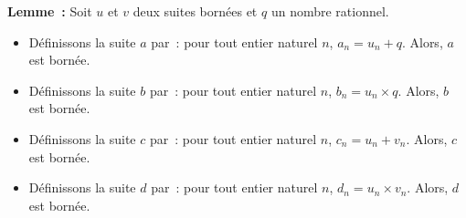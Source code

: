     \done

\medskip

\noindent\textbf{Lemme :} Soit $u$ et $v$ deux suites bornées et $q$ un nombre rationnel.
    \begin{itemize}[nosep]
        \item Définissons la suite $a$ par : pour tout entier naturel $n$, $a_n = u_n + q$.
            Alors, $a$ est bornée.
        \item Définissons la suite $b$ par : pour tout entier naturel $n$, $b_n = u_n \times q$.
            Alors, $b$ est bornée.
        \item Définissons la suite $c$ par : pour tout entier naturel $n$, $c_n = u_n + v_n$.
            Alors, $c$ est bornée.
        \item Définissons la suite $d$ par : pour tout entier naturel $n$, $d_n = u_n \times v_n$.
            Alors, $d$ est bornée.
    \end{itemize}

\medskip

